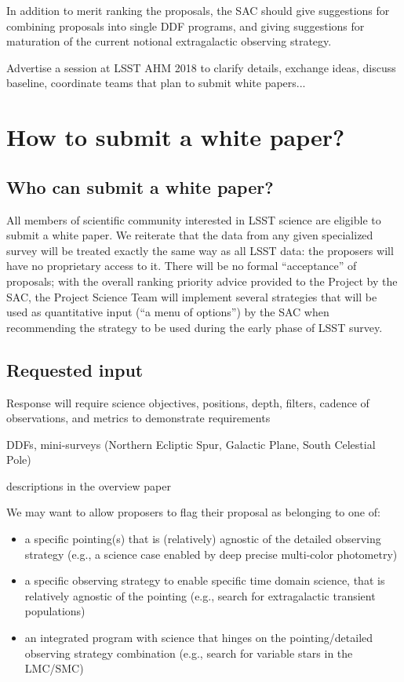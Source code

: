 \documentclass[DM,lsstdraft,toc,usenatbib]{lsstdoc}
\begin{document}
In addition to merit ranking the proposals, the SAC should give suggestions for combining proposals into single DDF programs, and giving suggestions for maturation of the current notional extragalactic observing strategy.


Advertise a session at LSST AHM 2018 to clarify details, exchange ideas, discuss baseline,
coordinate teams that plan to submit white papers... 



\section{How to submit a white paper?} 


\subsection{Who can submit a white paper?} 

All members of scientific community interested in LSST science are eligible to 
submit a white paper. We reiterate that the data from any given specialized survey 
will be treated exactly the same way as all LSST data: the proposers will have no 
proprietary access to it. There will be no formal ``acceptance'' of proposals; with
the overall ranking priority advice provided to the Project by the SAC, the Project
Science Team will implement several strategies that will be used as quantitative
input (``a menu of options'') by the SAC when recommending the strategy to be
used during the early phase of LSST survey. 



\subsection{Requested input}

Response will require science objectives, positions, depth, filters, cadence of observations, and metrics to demonstrate requirements
  

DDFs, mini-surveys (Northern Ecliptic Spur, Galactic Plane, South Celestial Pole) 

descriptions in the overview paper

We may want to allow proposers to flag their proposal as belonging to one of:
\begin{itemize} 
\item a specific pointing(s) that is (relatively) agnostic of the detailed observing strategy
          (e.g., a science case enabled by deep precise multi-color photometry) 
\item a specific observing strategy to enable specific time domain science, that is relatively 
          agnostic of the pointing (e.g., search for extragalactic transient populations) 
\item an integrated program with science that hinges on the pointing/detailed observing 
          strategy combination (e.g., search for variable stars in the LMC/SMC) 
\end{itemize}  
\end{document}

